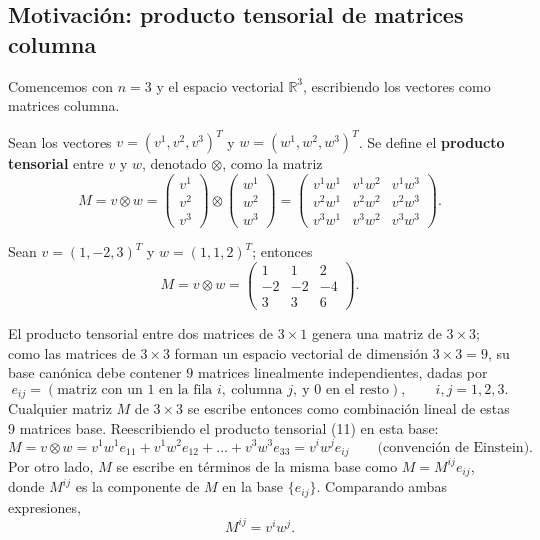 \subsection{Motivación: producto tensorial de matrices columna}

Comencemos con $n=3$ y el espacio vectorial $\mathbb{R}^3$, escribiendo
los vectores como matrices columna.

\begin{definicion}
Sean los vectores $v=(v^1,v^2,v^3)^T$ y $w=(w^1,w^2,w^3)^T$. Se define el
\textbf{producto tensorial} entre $v$ y $w$, denotado $\otimes$, como la
matriz
\[
M = v\otimes w = \begin{pmatrix} v^1 \\ v^2 \\ v^3 \end{pmatrix} \otimes
\begin{pmatrix} w^1 \\ w^2 \\ w^3 \end{pmatrix} = \begin{pmatrix}
v^1w^1 & v^1w^2 & v^1w^3 \\ v^2w^1 & v^2w^2 & v^2w^3 \\ v^3w^1 & v^3w^2 &
v^3w^3 \end{pmatrix}.
\]
\end{definicion}

\begin{ejemplo}
Sean $v=(1,-2,3)^T$ y $w=(1,1,2)^T$; entonces
\[
M = v\otimes w = \begin{pmatrix} 1 & 1 & 2 \\ -2 & -2 & -4 \\ 3 & 3 & 6
\end{pmatrix}.
\]
\end{ejemplo}

El producto tensorial entre dos matrices de $3\times 1$ genera una matriz
de $3\times 3$; como las matrices de $3\times 3$ forman un espacio
vectorial de dimensión $3\times 3=9$, su base canónica debe contener $9$
matrices linealmente independientes, dadas por
\[
e_{ij} = \left(\text{matriz con un } 1 \text{ en la fila } i,\ \text{columna } j,\ \text{y } 0
\text{ en el resto}\right), \qquad i,j=1,2,3.
\]
Cualquier matriz $M$ de $3\times 3$ se escribe entonces como combinación
lineal de estas 9 matrices base. Reescribiendo el producto tensorial
(11) en esta base:
\[
M = v\otimes w = v^1w^1e_{11} + v^1w^2e_{12} + \dots + v^3w^3e_{33} =
v^iw^j e_{ij} \qquad \text{(convención de Einstein)}.
\]
Por otro lado, $M$ se escribe en términos de la misma base como
$M = M^{ij}e_{ij}$, donde $M^{ij}$ es la componente de $M$ en la base
$\{e_{ij}\}$. Comparando ambas expresiones,
\[
M^{ij} = v^iw^j .
\]

